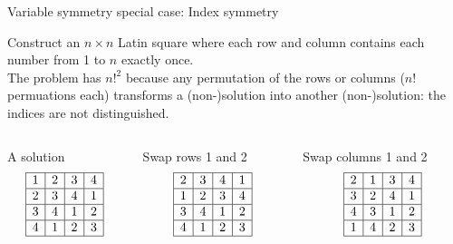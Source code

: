 \documentclass{cons-beamer}
\begin{document}
\begin{frame}{Variable symmetry special case: Index symmetry}
  \begin{example}
    Construct an $n \times n$ Latin square where each row and column contains each number from 1 to $n$ exactly once. \\[+5pt]
    The problem has $n!^2$  because any permutation of the rows or columns ($n!$ permuations each) transforms a (non-)solution into another (non-)solution: the indices are not distinguished.
  \end{example}
  \vfill

  \begin{columns}
    \begin{column}{0.3\textwidth}
      \centering A solution 
      \[
      \begin{array}{|c|c|c|c|}
      \hline
      1 & 2 & 3 & 4 \\
      \hline
      2 & 3 & 4 & 1 \\
      \hline
      3 & 4 & 1 & 2 \\
      \hline
      4 & 1 & 2 & 3 \\
      \hline
      \end{array}
      \]        
    \end{column}
    

    \begin{column}{0.3\textwidth}
      \quad Swap rows 1 and 2
      \[
      \begin{array}{|c|c|c|c|}
        \hline
        2 & 3 & 4 & 1 \\
        \hline
        1 & 2 & 3 & 4 \\
        \hline
        3 & 4 & 1 & 2 \\
        \hline
        4 & 1 & 2 & 3 \\
        \hline
      \end{array}
      \]        
    \end{column}
    

    \begin{column}{0.3\textwidth}
      Swap columns 1 and 2
      \[
      \begin{array}{|c|c|c|c|}
      \hline
      2 & 1 & 3 & 4 \\
      \hline
      3 & 2 & 4 & 1 \\
      \hline
      4 & 3 & 1 & 2 \\
      \hline
      1 & 4 & 2 & 3 \\
      \hline
      \end{array}
      \]        
    \end{column}    
  \end{columns}
\end{frame}
\end{document}

